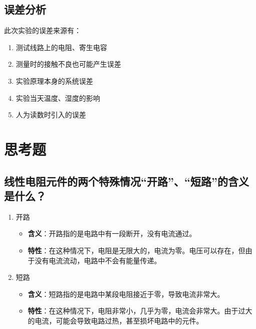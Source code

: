\documentclass[a4paper,utf8]{article}
\begin{document}
\subsection{误差分析}
此次实验的误差来源有：
\begin{enumerate}
    \item 测试线路上的电阻、寄生电容
    \item 测量时的接触不良也可能产生误差
    \item 实验原理本身的系统误差
    \item 实验当天温度、湿度的影响
    \item 人为读数时引入的误差
\end{enumerate}
\section{思考题}
\subsection{线性电阻元件的两个特殊情况“开路”、“短路”的含义是什么？}
\begin{enumerate}
    \item 开路
    \begin{itemize}
        \item \textbf{含义}：开路指的是电路中有一段断开，没有电流通过。
        \item \textbf{特性}：在这种情况下，电阻是无限大的，电流为零。电压可以存在，但由于没有电流流动，电路中不会有能量传递。
    \end{itemize}
    \item 短路
    \begin{itemize}
        \item \textbf{含义}：短路指的是电路中某段电阻接近于零，导致电流非常大。
        \item \textbf{特性}：在这种情况下，电阻非常小，几乎为零，电流会非常大。由于过大的电流，可能会导致电路过热，甚至损坏电路中的元件。
    \end{itemize}
\end{enumerate}
\end{document}
